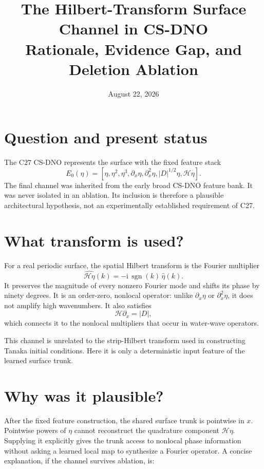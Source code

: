 \documentclass[11pt]{article}
\title{The Hilbert-Transform Surface Channel in CS-DNO\\
Rationale, Evidence Gap, and Deletion Ablation}
\author{}
\date{August 22, 2026}
\newcommand{\Hil}{\mathcal{H}}
\newcommand{\D}{D}
\begin{document}
\maketitle

\section{Question and present status}

The C27 CS-DNO represents the surface with the fixed feature stack
\begin{equation}
E_0(\eta)
=
\left[
\eta,
\eta^2,
\eta^3,
\partial_x\eta,
\partial_x^2\eta,
|\D|^{1/2}\eta,
\Hil\eta
\right].
\label{eq:feature-stack}
\end{equation}
The final channel was inherited from the early broad CS-DNO feature bank.
It was never isolated in an ablation.  Its inclusion is therefore a plausible
architectural hypothesis, not an experimentally established requirement of
C27.

\section{What transform is used?}

For a real periodic surface, the spatial Hilbert transform is the Fourier
multiplier
\begin{equation}
\widehat{\Hil\eta}(k)
=
-\mathrm{i}\,\operatorname{sgn}(k)\,\widehat{\eta}(k).
\label{eq:hilbert-symbol}
\end{equation}
It preserves the magnitude of every nonzero Fourier mode and shifts its phase
by ninety degrees.  It is an order-zero, nonlocal operator: unlike
$\partial_x\eta$ or $\partial_x^2\eta$, it does not amplify high wavenumbers.
It also satisfies
\begin{equation}
\Hil\partial_x = |\D|,
\label{eq:hilbert-derivative}
\end{equation}
which connects it to the nonlocal multipliers that occur in water-wave
operators.

This channel is unrelated to the strip-Hilbert transform used in constructing
Tanaka initial conditions.  Here it is only a deterministic input feature of
the learned surface trunk.

\section{Why was it plausible?}

After the fixed feature construction, the shared surface trunk is pointwise in
$x$.  Pointwise powers of $\eta$ cannot reconstruct the quadrature component
$\Hil\eta$.  Supplying it explicitly gives the trunk access to nonlocal phase
information without asking a learned local map to synthesize a Fourier
operator.  A concise explanation, if the channel survives ablation, is:
\end{document}
